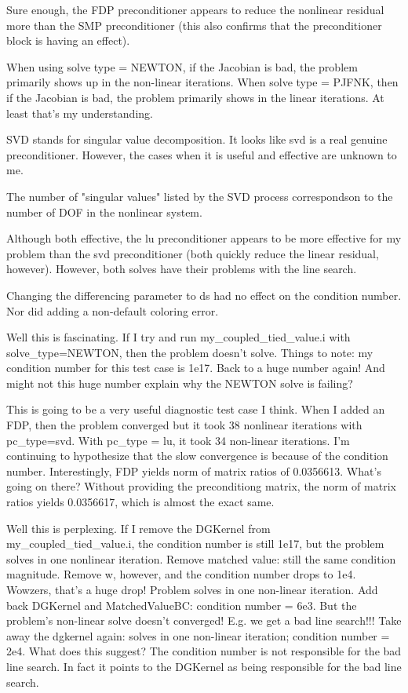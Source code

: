 {Sure enough, the FDP preconditioner appears to reduce the nonlinear residual more than the SMP preconditioner (this also confirms that the preconditioner block is having an effect).

When using solve type = NEWTON, if the Jacobian is bad, the problem primarily shows up in the non-linear iterations. When solve type = PJFNK, then if the Jacobian is bad, the problem primarily shows in the linear iterations. At least that's my understanding.

SVD stands for singular value decomposition. It looks like svd is a real genuine preconditioner. However, the cases when it is useful and effective are unknown to me.

The number of "singular values" listed by the SVD process correspondson to the number of DOF in the nonlinear system.

Although both effective, the lu preconditioner appears to be more effective for my problem than the svd preconditioner (both quickly reduce the linear residual, however). However, both solves have their problems with the line search.

Changing the differencing parameter to ds had no effect on the condition number. Nor did adding a non-default coloring error.

Well this is fascinating. If I try and run my_coupled_tied_value.i with solve_type=NEWTON, then the problem doesn't solve. Things to note: my condition number for this test case is 1e17. Back to a huge number again! And might not this huge number explain why the NEWTON solve is failing?

This is going to be a very useful diagnostic test case I think. When I added an FDP, then the problem converged but it took 38 nonlinear iterations with pc_type=svd. With pc_type = lu, it took 34 non-linear iterations. I'm continuing to hypothesize that the slow convergence is because of the condition number. Interestingly, FDP yields norm of matrix ratios of 0.0356613. What's going on there? Without providing the preconditiong matrix, the norm of matrix ratios yields 0.0356617, which is almost the exact same.

Well this is perplexing. If I remove the DGKernel from my_coupled_tied_value.i, the condition number is still 1e17, but the problem solves in one nonlinear iteration. Remove matched value: still the same condition magnitude. Remove w, however, and the condition number drops to 1e4. Wowzers, that's a huge drop! Problem solves in one non-linear iteration. Add back DGKernel and MatchedValueBC: condition number = 6e3. But the problem's non-linear solve doesn't converged! E.g. we get a bad line search!!! Take away the dgkernel again: solves in one non-linear iteration; condition number = 2e4. What does this suggest? The condition number is not responsible for the bad line search. In fact it points to the DGKernel as being responsible for the bad line search.

}
